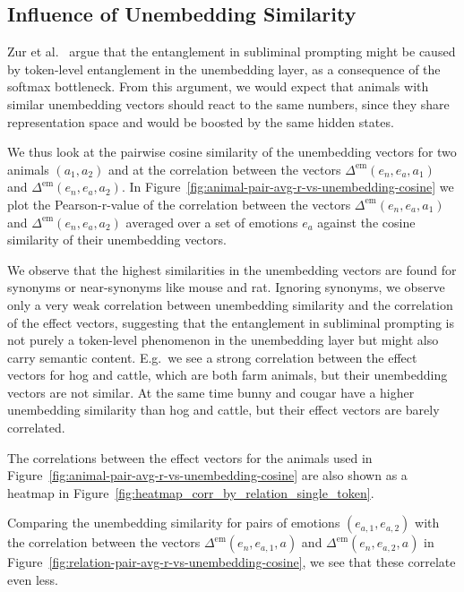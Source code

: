 \documentclass[10pt,twocolumn]{article}
\begin{document}
\begin{qualitymark}[cyan]
    \subsection{Influence of Unembedding Similarity}
    Zur et al.~\cite{zurItsOwlNumbers2025} argue that the entanglement in subliminal prompting might be caused by token-level entanglement in the unembedding layer, as a consequence of the softmax bottleneck.
    From this argument, we would expect that animals with similar unembedding vectors should react to the same numbers, since they share representation space and would be boosted by the same hidden states.
    
    We thus look at the pairwise cosine similarity of the unembedding vectors for two animals $(a_1, a_2)$ and at the correlation between the vectors $\Delta^\text{em}(e_n, e_a, a_1)$ and $\Delta^\text{em}(e_n, e_a, a_2)$.
    In Figure~\ref{fig:animal-pair-avg-r-vs-unembedding-cosine} we plot the Pearson-r-value of the correlation between the vectors $\Delta^\text{em}(e_n, e_a, a_1)$ and $\Delta^\text{em}(e_n, e_a, a_2)$ averaged over a set of emotions $e_a$ against the cosine similarity of their unembedding vectors.

    We observe that the highest similarities in the unembedding vectors are found for synonyms or near-synonyms like mouse and rat. 
    Ignoring synonyms, we observe only a very weak correlation between unembedding similarity and the correlation of the effect vectors, suggesting that the entanglement in subliminal prompting is not purely a token-level phenomenon in the unembedding layer but might also carry semantic content.
    E.g.~we see a strong correlation between the effect vectors for hog and cattle, which are both farm animals, but their unembedding vectors are not similar.
    At the same time bunny and cougar have a higher unembedding similarity than hog and cattle, but their effect vectors are barely correlated.

    The correlations between the effect vectors for the animals used in Figure~\ref{fig:animal-pair-avg-r-vs-unembedding-cosine} are also shown as a heatmap in Figure~\ref{fig:heatmap_corr_by_relation_single_token}.

    Comparing the unembedding similarity for pairs of emotions $(e_{a,1}, e_{a,2})$ with the correlation between the vectors $\Delta^\text{em}(e_n, e_{a,1}, a)$ and $\Delta^\text{em}(e_n, e_{a,2}, a)$ in Figure~\ref{fig:relation-pair-avg-r-vs-unembedding-cosine}, we see that these correlate even less.


\end{qualitymark}
\end{document}
